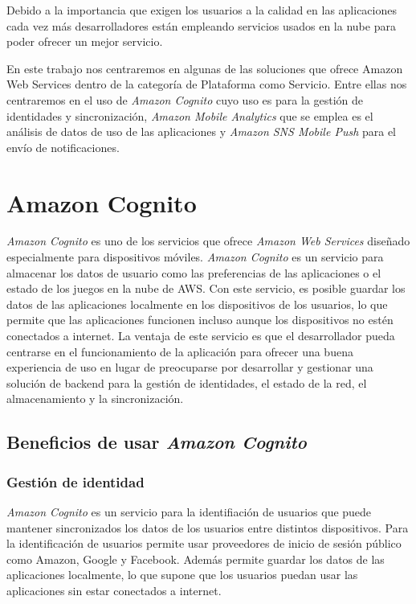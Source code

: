 \documentclass{article}
\begin{document}
	Debido a la importancia que exigen los usuarios a la calidad en las aplicaciones cada vez más desarrolladores están empleando servicios usados en la nube para poder ofrecer un mejor servicio.
	
	En este trabajo nos centraremos en algunas de las soluciones que ofrece Amazon Web Services dentro de la categoría de Plataforma como Servicio. Entre ellas nos centraremos en el uso de \emph{Amazon Cognito}\cite{Cognito} cuyo uso es para la gestión de identidades y sincronización, \emph{Amazon Mobile Analytics}\cite{Analytics} que se emplea es el análisis de datos de uso de las aplicaciones y \emph{Amazon SNS Mobile Push}\cite{Sns} para el envío de notificaciones.


\section{Amazon Cognito}

	\emph{Amazon Cognito}  es uno de los servicios que ofrece \emph{Amazon Web Services} diseñado especialmente para dispositivos móviles. \emph{Amazon Cognito} es un servicio para almacenar los datos de usuario como las preferencias de las aplicaciones o el estado de los juegos en la nube de AWS. Con este servicio, es posible guardar los datos de las aplicaciones localmente en los dispositivos de los usuarios, lo que permite que las aplicaciones funcionen incluso aunque los dispositivos no estén conectados a internet. La ventaja de este servicio es que el desarrollador pueda centrarse en el funcionamiento de la aplicación para ofrecer una buena experiencia de uso en lugar de preocuparse por desarrollar y gestionar una solución de backend para la gestión de identidades, el estado de la red, el almacenamiento y la sincronización.

\subsection{Beneficios de usar \emph{Amazon Cognito}}

\subsubsection{Gestión de identidad}
	\emph{Amazon Cognito} es un servicio para la identifiación de usuarios que puede mantener sincronizados los datos de los usuarios entre distintos dispositivos. Para la identificación de usuarios permite usar proveedores de inicio de sesión público como Amazon, Google y Facebook.  Además permite guardar los datos de las aplicaciones localmente, lo que supone que los usuarios puedan usar las aplicaciones sin estar conectados a internet.
	
\end{document}
